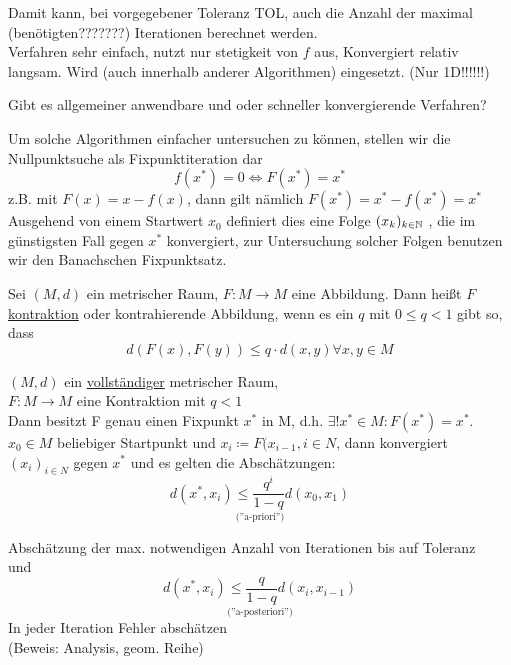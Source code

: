 \documentclass[../Skript.tex]{subfiles}
\begin{document}
Damit kann, bei vorgegebener Toleranz TOL, auch die Anzahl der maximal 
(benötigten???????) Iterationen berechnet werden.\\
Verfahren sehr einfach, nutzt nur stetigkeit von \(f\) aus, Konvergiert relativ 
langsam. Wird (auch innerhalb anderer Algorithmen) eingesetzt. (Nur 1D!!!!!!)\\

\begin{question}
    Gibt es allgemeiner anwendbare und oder schneller konvergierende Verfahren?
\end{question}
Um solche Algorithmen einfacher untersuchen zu können, stellen wir die Nullpunktsuche 
als Fixpunktiteration dar \[
    f(x^*) = 0 \iff F(x^*) = x^*\]
z.B. mit $F(x) = x - f(x)$, dann gilt nämlich $F(x^*) = x^* - f(x^*) = x^*$
Ausgehend von einem Startwert $x_0$ definiert dies eine Folge $(x_k)_{k\in\mathbb{N}}$ , die im
günstigsten Fall gegen $x^*$ konvergiert, zur Untersuchung solcher Folgen benutzen wir den
Banachschen Fixpunktsatz.
\begin{definition}
    Sei $(M, d)$ ein metrischer Raum, $F:M \to M$ eine Abbildung. Dann heißt $F$ \underline{kontraktion}
    oder kontrahierende Abbildung, wenn es ein $q$ mit $0\leq q<1$ gibt so, dass \[
        d(F(x), F(y)) \leq q\cdot d(x, y) \forall x,y\in M\]  
\end{definition}


\begin{theorem}
    \((M,d)\) ein \underline{vollständiger} metrischer Raum,\\
    \(F:M\to M\) eine Kontraktion mit \(q<1\)\\
    Dann besitzt F genau einen Fixpunkt \(x^*\) in M, d.h. \(\exists !x^*\in M:
    F(x^*)=x^*\).\\
    \(x_0\in M\) beliebiger Startpunkt und \(x_i\coloneqq F(x_{i-1}, i\in N\),
    dann konvergiert \((x_i)_{i\in N}\) gegen \(x^*\) und es gelten die
    Abschätzungen:
    \[\underset{\text{(''a-priori'')}}{d(x^*,x_i)\leq \frac{q^{i}}{1-q}d(x_0,x_1)}
    \] 
    
    Abschätzung der max. notwendigen Anzahl von Iterationen bis auf Toleranz\\
    und
    \[\underset{\text{(''a-posteriori'')}}{d(x^*,x_i)\leq \frac{q}{1-q}d(x_i,x_{i-1})}\]
    In jeder Iteration Fehler abschätzen\\
    
    (Beweis: Analysis, geom. Reihe)
\end{theorem}
\end{document}
